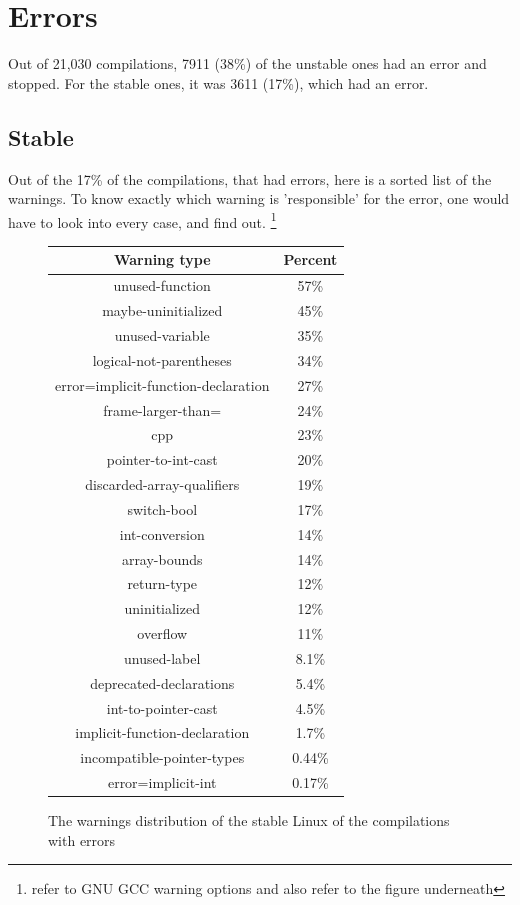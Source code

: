 \documentclass[a4paper,11pt]{report}
\newcommand{\figa}{
    \begin{figure}[!htpb]
    \centering
}
\newcommand{\figb}[2]{
    \caption{#1}
    \label{#2}
    \end{figure}
}
\begin{document}
    \section{Errors}

Out of 21,030 compilations, 7911 (38\%) of the unstable ones had an error and 
stopped. For the stable ones, it was 3611 (17\%), which had an error.

    \subsection{Stable}

Out of the 17\% of the compilations, that had errors, here is a sorted list of 
the warnings. To know exactly which warning is 'responsible' for the error, 
one would have to look into every case, and find out.
    \footnote{refer to GNU GCC warning options and also refer to the figure 
        underneath}


\figa
    \begin{tabular}{c|c}
        \hline 
        \hline

        \textbf{Warning type} & \textbf{Percent} \\

        \hline

        unused-function & 57\% \\
        maybe-uninitialized & 45\% \\
        unused-variable & 35\% \\
        logical-not-parentheses & 34\% \\
        error=implicit-function-declaration & 27\% \\
        frame-larger-than= & 24\% \\
        cpp & 23\% \\
        pointer-to-int-cast & 20\% \\
        discarded-array-qualifiers & 19\% \\
        switch-bool & 17\% \\
        int-conversion & 14\% \\
        array-bounds & 14\% \\
        return-type & 12\% \\
        uninitialized & 12\% \\
        overflow & 11\% \\
        unused-label & 8.1\% \\
        deprecated-declarations & 5.4\% \\
        int-to-pointer-cast & 4.5\% \\
        implicit-function-declaration & 1.7\% \\
        incompatible-pointer-types & 0.44\% \\
        error=implicit-int & 0.17\% \\

        \hline 
        \hline
    \end{tabular}
\figb{The warnings distribution of the stable Linux of the compilations with 
    errors}{tab:stablewarnwitherrs}
\end{document}
